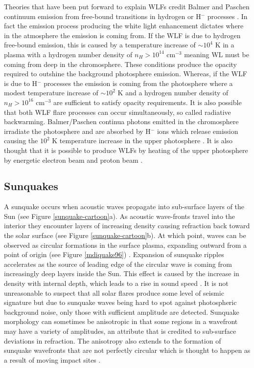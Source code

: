 Theories that have been put forward to explain WLFs credit Balmer and Paschen continuum emission from free-bound transitions in hydrogen or H$^{-}$ processes \citep{1976GAM.....8.....S}. In fact the emission process producing the white light enhancement dictates where in the atmosphere the emission is coming from. If the WLF is due to hydrogen free-bound emission, this is caused by a temperature increase of $\sim10^{4}$ K in a plasma with a hydrogen number density of $n_{H}>10^{14}$ cm$^{-3}$ meaning WL must be coming from deep in the chromosphere. These conditions produce the opacity required to outshine the background photosphere emission. Whereas, if the WLF is due to H$^{-}$ processes the emission is coming from the photosphere where a modest temperature increase of $\sim10^{2}$ K and a hydrogen number density of $n_{H}>10^{16}$ cm$^{-3}$ are sufficient to satisfy opacity requirements. It is also possible that both WLF flare processes can occur simultaneously, so called radiative backwarming. Balmer/Paschen continua photons emitted in the chromosphere  irradiate the photosphere and are absorbed by H$^{-}$ ions which release emission causing the $10^{2}$ K temperature increase in the upper photosphere \citep{1989SoPh..124..303M}. It is also thought that it is possible to produce WLFs by heating of the upper photosphere by energetic electron beam \citep{1972SoPh...24..414H} and proton beam \citep{1978SoPh...58..363M}.  




\subsection{Sunquakes}
A sunquake occurs when acoustic waves propagate into sub-surface layers of the Sun (see Figure \ref{sunquake-cartoon}a). As acoustic wave-fronts travel into the interior they encounter layers of increasing density causing refraction back toward the solar surface (see Figure \ref{sunquake-cartoon}b). At which point, waves can be observed as circular formations in the surface plasma, expanding outward from a point of origin (see Figure \ref{mdiquake96}) \citep{2014arXiv1402.1249K}. Expansion of sunquake ripples accelerates as the source of leading edge of the circular wave is coming from increasingly deep layers inside the Sun. This effect is caused by the increase in density with internal depth, which leads to a rise in sound speed \citep{1998Natur.393..317K}. It is not unreasonable to suspect that all solar flares produce some level of seismic signature but due to sunquake waves being hard to spot against photospheric background noise, only those with sufficient amplitude are detected. Sunquake morphology can sometimes be anisotropic in that some regions in a wavefront may have a variety of amplitudes, an attribute that is credited to sub-surface deviations in refraction. The anisotropy also extends to the formation of sunquake wavefronts that are not perfectly circular which is thought to happen as a result of moving impact sites \citep{2006ESASP.624E.134K}. 


